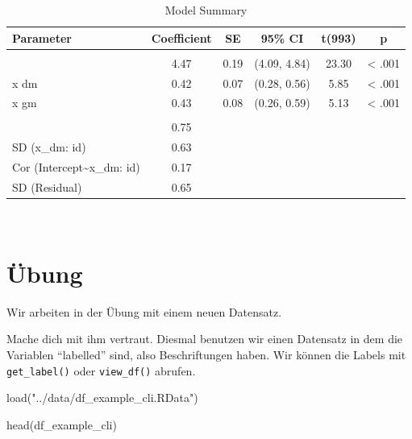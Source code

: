 \documentclass[
  letterpaper,
  DIV=11,
  numbers=noendperiod]{scrreprt}
\newenvironment{Shaded}{\begin{snugshade}}{\end{snugshade}}
\newcommand{\FunctionTok}[1]{\textcolor[rgb]{0.28,0.35,0.67}{#1}}
\newcommand{\NormalTok}[1]{\textcolor[rgb]{0.00,0.23,0.31}{#1}}
\newcommand{\StringTok}[1]{\textcolor[rgb]{0.13,0.47,0.30}{#1}}
\begin{document}
\begin{table}
\caption*{
{\large Model Summary}
} 
\fontsize{12.0pt}{14.4pt}\selectfont
\begin{tabular*}{\linewidth}{@{\extracolsep{\fill}}lccccc}
\toprule
Parameter & Coefficient & SE & 95\% CI & t(993) & p \\ 
\midrule\addlinespace[2.5pt]
\multicolumn{6}{l}{{\slshape Fixed Effects }} \\[2.5pt] 
\midrule\addlinespace[2.5pt]
{(Intercept)} & 4.47 & 0.19 & (4.09, 4.84) & 23.30 & < .001 \\ 
{x dm} & 0.42 & 0.07 & (0.28, 0.56) & 5.85 & < .001 \\ 
{x gm} & 0.43 & 0.08 & (0.26, 0.59) & 5.13 & < .001 \\ 
\midrule\addlinespace[2.5pt]
\multicolumn{6}{l}{{\slshape Random Effects }} \\[2.5pt] 
\midrule\addlinespace[2.5pt]
{SD (Intercept: id)} & 0.75 &  &  &  &  \\ 
{SD (x\_dm: id)} & 0.63 &  &  &  &  \\ 
{Cor (Intercept\textasciitilde{}x\_dm: id)} & 0.17 &  &  &  &  \\ 
{SD (Residual)} & 0.65 &  &  &  &  \\ 
\bottomrule
\end{tabular*}
\begin{minipage}{\linewidth}
\\
\end{minipage}
\end{table}

\section{Übung}\label{uxfcbung-1}

Wir arbeiten in der Übung mit einem neuen Datensatz.

Mache dich mit ihm vertraut. Diesmal benutzen wir einen Datensatz in dem
die Variablen ``labelled'' sind, also Beschriftungen haben. Wir können
die Labels mit \texttt{get\_label()} oder \texttt{view\_df()} abrufen.

\begin{Shaded}
\begin{Highlighting}[]
\FunctionTok{load}\NormalTok{(}\StringTok{"../data/df\_example\_cli.RData"}\NormalTok{)}

\FunctionTok{head}\NormalTok{(df\_example\_cli)}
\end{Highlighting}
\end{Shaded}
\end{document}
